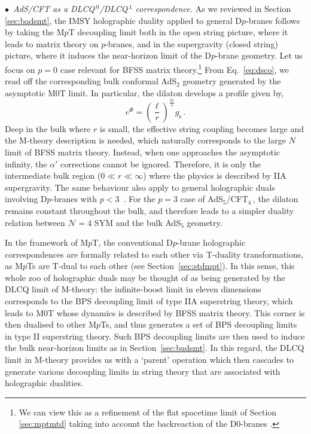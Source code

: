 \documentclass[11pt]{article}
\newcommand{\be}{\begin{equation}}
\newcommand{\ee}{\end{equation}}
\newcommand{\CN}{\mathcal{N}}
\newcommand{\lr}{\left (}
\newcommand{\rr}{\right )}
\renewcommand{\emph}[1]{\textit{#1}}
\begin{document}
\vspace{3mm}

\noindent $\bullet$~\emph{AdS/CFT as a DLCQ$\,{}^0$/DLCQ$\,{}^1$ correspondence.}
As we reviewed in Section \ref{sec:badsmt}, the IMSY holographic duality applied to general D$p$-branes follows by taking the M$p$T decoupling limit both in the open string picture, where it leads to matrix theory on $p$-branes, and in the supergravity (closed string) picture, where it induces the near-horizon limit of the D$p$-brane geometry.  
Let us focus on $p=0$ case relevant for BFSS matrix theory.\footnote{We can view this as a refinement of the flat spacetime limit of Section \ref{sec:mptmtd} taking into account the backreaction of the D0-branes \cite{Balasubramanian:1997kd, Polchinski:1999br}.}
From Eq.~\eqref{eq:dsco}, we read off the corresponding bulk conformal AdS${}_2$ geometry generated by the asymptotic M0T limit. In particular, the dilaton develops a profile given by,
%
\be
e^\Phi = \lr \frac{\ell}{r} \rr^{\!\!\frac{21}{4}} g^{}_\text{s}\,.
\ee
%
Deep in the bulk where $r$ is small, the effective string coupling becomes large and the M-theory description is needed, which naturally corresponds to the large $N$ limit of BFSS matrix theory. Instead, when one approaches the asymptotic infinity, the $\alpha'$ corrections cannot be ignored.
Therefore, it is only the intermediate bulk region ($0 \ll r \ll \infty$) where the physics is described by IIA supergravity. The same behaviour also apply to general holographic duals involving D$p$-branes with $p < 3$~\cite{Itzhaki:1998dd}. For the $p=3$ case of AdS${}_5$/CFT${}_4$\,, the dilaton remains constant throughout the bulk, and therefore leads to a simpler duality relation between $\CN = 4$ SYM and the bulk AdS${}_5$ geometry. 

In the framework of M$p$T, the conventional D$p$-brane holographic correspondences are formally related to each other via T-duality transformations, as M$p$Ts are T-dual to each other (see Section~\ref{sec:stdmpt}). In this sense, this whole zoo of holographic duals may be thought of as being generated by the DLCQ limit of M-theory: the infinite-boost limit in eleven dimensions corresponds to the BPS decoupling limit of type IIA superstring theory, which leads to M0T whose dynamics is described by BFSS matrix theory. This corner is then dualised to other M$p$Ts, and thus generates a set of BPS decoupling limits in type II superstring theory. Such BPS decoupling limits are then used to induce the bulk near-horizon limits as in Section~\ref{sec:badsmt}. In this regard, the DLCQ limit in M-theory provides us with a `parent' operation which then cascades to generate various decoupling limits in string theory that are associated with holographic dualities.
\end{document}

